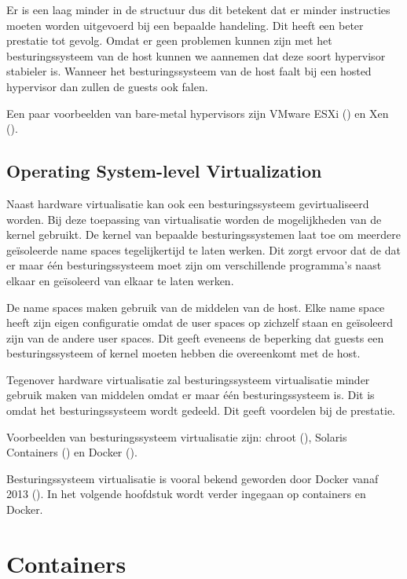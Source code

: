 \documentclass[pdftex,a4paper,12pt,twoside]{report}
\begin{document}
Er is een laag minder in de structuur dus dit betekent dat er minder instructies moeten worden uitgevoerd  bij een bepaalde handeling. Dit heeft een beter prestatie tot gevolg. Omdat er geen problemen kunnen zijn met het besturingssysteem van de host kunnen we aannemen dat deze soort hypervisor stabieler is. Wanneer het besturingssysteem van de host faalt bij een hosted hypervisor dan zullen de guests ook falen.

Een paar voorbeelden van bare-metal hypervisors zijn VMware ESXi (\cite{vmware_vmware_2016}) en Xen (\cite{xen_project_xen_2016}).

\section{Operating System-level Virtualization}

Naast hardware virtualisatie kan ook een besturingssysteem gevirtualiseerd worden. Bij deze toepassing van virtualisatie worden de mogelijkheden van de kernel gebruikt. De kernel van bepaalde besturingssystemen laat toe om meerdere geïsoleerde name spaces tegelijkertijd te laten werken. Dit zorgt ervoor dat de dat er maar één besturingssysteem moet zijn om verschillende programma's naast elkaar en geïsoleerd van elkaar te laten werken.

De name spaces maken gebruik van de middelen van de host. Elke name space heeft zijn eigen configuratie omdat de user spaces op zichzelf staan en geïsoleerd zijn van de andere user spaces. Dit geeft eveneens de beperking dat guests een besturingssysteem of kernel moeten hebben die overeenkomt met de host.

Tegenover hardware virtualisatie zal besturingssysteem virtualisatie minder gebruik maken van middelen omdat er maar één besturingssysteem is. Dit is omdat het besturingssysteem wordt gedeeld. Dit geeft voordelen bij de prestatie.

Voorbeelden van besturingssysteem virtualisatie zijn: chroot (\cite{linux_chroot2_????}), Solaris Containers (\cite{oracle_solaris_2016}) en Docker (\cite{docker_docker_2016}).

Besturingssysteem virtualisatie is vooral bekend geworden door Docker vanaf 2013 (\cite{hykes_future_2013}). In het volgende hoofdstuk wordt verder ingegaan op containers en Docker.

\chapter{Containers}
\label{ch:Containers}
\end{document}
